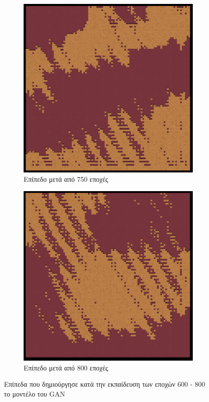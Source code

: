 \begin{figure}[H]
\begin{subfigure}{.5\textwidth}
  \centering
  \includegraphics[width=.8\linewidth]{../images/generated/750.png}
  \caption{Επίπεδο μετά από 750 εποχές}
  \label{fig:sfig2}
\end{subfigure}
\begin{subfigure}{.5\textwidth}
  \centering
  \includegraphics[width=.8\linewidth]{../images/generated/800.png}
  \caption{Επίπεδο μετά από 800 εποχές}
  \label{fig:sfig2}
\end{subfigure}
\caption{Επίπεδα που δημιούργησε κατά την εκπαίδευση των εποχών 600 - 800 το μοντέλο του GAN}
\label{fig:fig}
\end{figure}


